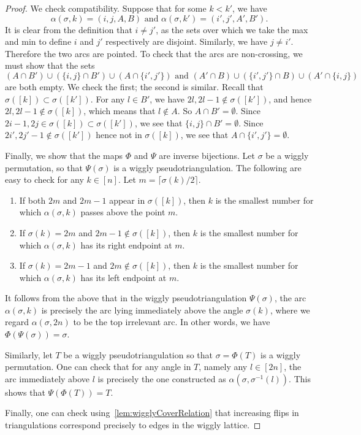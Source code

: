 \documentclass{amsart}
\theoremstyle{definition}
\newcommand{\asilata}[2][]{\todo[size=\scriptsize, color=orange!30,#1]{\rm #2 \\ \hfill --- A.}}
\begin{document}
\begin{proof}
  We check compatibility.
  Suppose that for some \(k < k'\), we have 
  \[\alpha(\sigma,k) = (i,j,A,B) \text{ and }\alpha(\sigma,k') = (i',j',A',B').\]
  It is clear from the definition that \(i \neq j'\), as the sets over which we take the max and min to define \(i\) and \(j'\) respectively are disjoint.
  Similarly, we have \(j \neq i'\).
  Therefore the two arcs are pointed.
  To check that the arcs are non-crossing, we must show that the sets
  \[(A \cap B') \cup (\{i,j\} \cap B') \cup (A \cap \{i',j'\}) \text{ and } (A' \cap B) \cup (\{i',j'\} \cap B) \cup (A' \cap \{i,j\})\]
  are both empty.
  We check the first; the second is similar.
  Recall that \(\sigma([k]) \subset \sigma([k'])\).
  For any \(l \in B'\), we have \(2l, 2l-1 \notin \sigma([k'])\), and hence \(2l, 2l-1 \notin \sigma([k])\), which means that \(l \notin A\).
  So \(A \cap B' = \emptyset\).
  Since \(2i - 1, 2j \in \sigma([k]) \subset \sigma([k'])\), we see that \(\{i,j\} \cap B' = \emptyset\).
  Since \(2i', 2j'-1 \notin \sigma([k'])\) hence not in \(\sigma([k])\), we see that \(A \cap \{i',j'\} = \emptyset\).

  Finally, we show that the maps \(\Phi\) and \(\Psi\) are inverse bijections.
  Let \(\sigma\) be a wiggly permutation, so that \(\Psi(\sigma)\) is a wiggly pseudotriangulation.
  The following are easy to check for any \(k \in [n]\).
  Let \(m = \lceil \sigma(k)/2 \rceil\).
  \begin{enumerate}
  \item If both \(2m\) and \(2m -1\) appear in \(\sigma([k])\), then \(k\) is the smallest number for which \(\alpha(\sigma,k)\) passes above the point \(m\).
  \item If \(\sigma(k) = 2m\) and \(2m - 1 \notin \sigma([k])\), then \(k\) is the smallest number for which \(\alpha(\sigma,k)\) has its right endpoint at \(m\).
  \item If \(\sigma(k) = 2m - 1\) and \(2m \notin \sigma([k])\), then \(k\) is the smallest number for which \(\alpha(\sigma,k)\) has its left endpoint at \(m\).
  \end{enumerate}
  It follows from the above that in the wiggly pseudotriangulation \(\Psi(\sigma)\), the arc \(\alpha(\sigma,k)\) is precisely the arc lying immediately above the angle \(\sigma(k)\), where we regard \(\alpha(\sigma,2n)\) to be the top irrelevant arc.
  In other words, we have \(\Phi(\Psi(\sigma)) = \sigma\).

  Similarly, let \(T\) be a wiggly pseudotriangulation so that \(\sigma = \Phi(T)\) is a wiggly permutation.
  One can check that for any angle in \(T\), namely any \(l \in [2n]\), the arc immediately above \(l\) is precisely the one constructed as \(\alpha(\sigma,\sigma^{-1}(l))\).
  This shows that \(\Psi(\Phi(T)) = T\).

  Finally, one can check using~\cref{lem:wigglyCoverRelation} that increasing flips in triangulations correspond precisely to edges in the wiggly lattice.
  \asilata{Todo: more details here?}
\item 


\end{proof}
\end{document}
